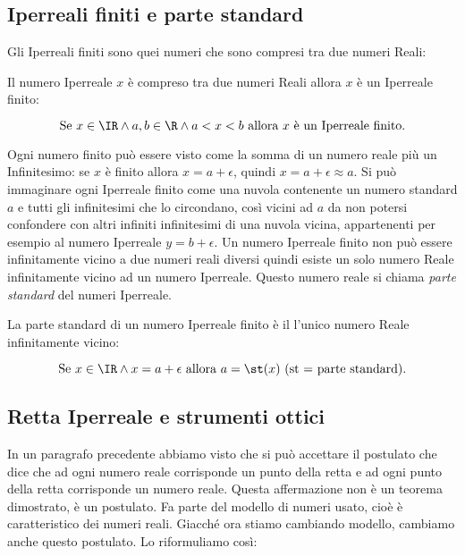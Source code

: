 \subsection{Iperreali finiti e parte standard}
\label{subsec:insnum_partestandard}

Gli Iperreali finiti sono quei numeri che sono compresi tra due numeri Reali:

\begin{definizione}
 Il numero Iperreale $x$ è compreso tra due numeri Reali allora $x$ è un 
Iperreale finito:

\[\text{Se } x \in \IR \wedge a, b \in \R \wedge 
  a < x < b \text{ allora } x \text{ è un Iperreale finito.}\]
\end{definizione}

Ogni numero finito può essere visto come la somma di un numero reale più un 
Infinitesimo: se $x$ è finito allora $x = a + \epsilon$, quindi 
$x=a+\epsilon\approx a$. Si può immaginare ogni Iperreale finito come una
nuvola contenente un numero standard $a$ e tutti gli infinitesimi che lo 
circondano, così vicini ad $a$ da non potersi confondere con altri infiniti
infinitesimi di una nuvola vicina, appartenenti per esempio al numero 
Iperreale
$y=b+\epsilon$. Un numero Iperreale finito non può essere infinitamente 
vicino 
a due numeri reali diversi quindi esiste un solo numero Reale infinitamente 
vicino ad un numero Iperreale. 
Questo numero reale si chiama \emph{parte standard} del numeri Iperreale.

\begin{definizione}
 La parte standard di un numero Iperreale finito è il l'unico numero Reale 
infinitamente vicino:

\[\text{Se } x \in \IR \wedge x= a+\epsilon \text{ allora } 
a= \st(x) \text{ (st = parte standard).}\]
\end{definizione}


\subsection{Retta Iperreale e strumenti ottici}
\label{subsec:insnum_retta}

In un paragrafo precedente abbiamo visto che si può accettare il postulato 
che 
dice che ad ogni numero reale corrisponde un punto della retta e ad ogni 
punto della retta corrisponde un numero reale. 
Questa affermazione non è un teorema dimostrato, è un postulato. Fa parte del 
modello
di numeri usato, cioè è caratteristico dei numeri reali. Giacché ora stiamo 
cambiando
modello, cambiamo anche questo postulato. Lo riformuliamo così:

